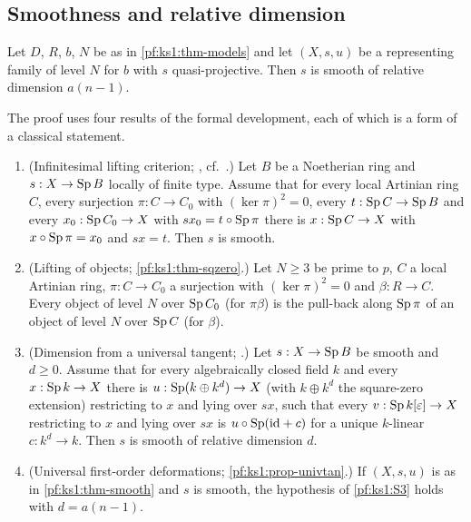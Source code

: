 \subsection{Smoothness and relative dimension}\label{pf:ks1:sec-smooth}

\begin{theorem}[Smoothness]\label{pf:ks1:thm-smooth}
Let $D$, $R$, $b$, $N$ be as in \cref{pf:ks1:thm-models} and let $(X,s,u)$ be a representing family of level
$N$ for $b$ with $s$ quasi-projective. Then $s$ is smooth of relative dimension $a(n-1)$.
\end{theorem}

The proof uses four results of the formal development, each of which is a form of a classical statement.

\begin{enumerate}[label=(S\arabic*)]
\item\label{pf:ks1:S1} (Infinitesimal lifting criterion; ,
  cf.\ \cite[\S17]{Grothendieck1967}.) Let $B$ be a Noetherian ring and $s:X\to\operatorname{Sp} B$ locally of finite type.
  Assume that for every local Artinian ring $C$, every surjection $\pi:C\to C_0$ with $(\ker\pi)^2=0$, every
  $t:\operatorname{Sp} C\to\operatorname{Sp} B$ and every $x_0:\operatorname{Sp} C_0\to X$ with $sx_0=t\circ\operatorname{Sp}\pi$ there is
  $x:\operatorname{Sp} C\to X$ with $x\circ\operatorname{Sp}\pi=x_0$ and $sx=t$. Then $s$ is smooth.
\item\label{pf:ks1:S2} (Lifting of objects; \cref{pf:ks1:thm-sqzero}.)
  Let $N\ge3$ be prime to $p$, $C$ a local Artinian ring, $\pi:C\to C_0$ a surjection with $(\ker\pi)^2=0$ and
  $\beta:R\to C$. Every object of level $N$ over $\operatorname{Sp} C_0$ (for $\pi\beta$) is the pull-back along
  $\operatorname{Sp}\pi$ of an object of level $N$ over $\operatorname{Sp} C$ (for $\beta$).
\item\label{pf:ks1:S3} (Dimension from a universal tangent; .)
  Let $s:X\to\operatorname{Sp} B$ be smooth and $d\ge0$. Assume that for every algebraically closed field $k$ and every
  $x:\operatorname{Sp} k\to X$ there is $u:\operatorname{Sp}(k\oplus k^d)\to X$ (with $k\oplus k^d$ the square-zero extension)
  restricting to $x$ and lying over $s x$, such that every $v:\operatorname{Sp} k[\varepsilon]\to X$ restricting to $x$
  and lying over $sx$ is $u\circ\operatorname{Sp}(\mathrm{id}+c)$ for a unique $k$-linear $c:k^d\to k$. Then $s$ is smooth
  of relative dimension $d$.
\item\label{pf:ks1:S4} (Universal first-order deformations; \cref{pf:ks1:prop-univtan}.)
  If $(X,s,u)$ is as in \cref{pf:ks1:thm-smooth} and $s$ is smooth, the hypothesis of \ref{pf:ks1:S3} holds
  with $d=a(n-1)$.
\end{enumerate}

